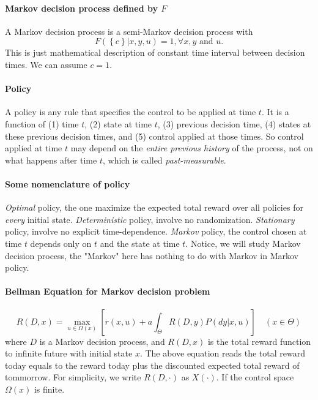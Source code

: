 \paragraph{Markov decision process defined by $F$}
A Markov decision process is a semi-Markov decision process with 
\[
	F\left( \left\{ c \right\} | x, y, u \right) = 1, \forall x, y \textrm{ and } u.
\]
This is just mathematical description of constant time interval between decision times. We can assume $c=1$.

\paragraph{Policy}
A policy is any rule that specifies the control to be applied at time $t$. It is a function of (1) time $t$, (2) state at time $t$, (3) previous decision time,
(4) states at these previous decision times, and (5) control applied at those times. So control applied at time $t$
may depend on the \textit{entire previous history} of the process, not on what happens after time $t$, which is called 
\textit{past-measurable}.

\paragraph{Some nomenclature of policy}
\textit{Optimal} policy, the one maximize the expected total reward over all policies for  \textit{every} initial state.
\textit{Deterministic} policy, involve no randomization.
\textit{Stationary} policy, involve no explicit time-dependence.
\textit{Markov} policy, the control chosen at time $t$ depends only on $t$ and the state at time $t$.
Notice, we will study Markov decision process, the "Markov" here has nothing to do with Markov in Markov policy.


\paragraph{Bellman Equation for Markov decision problem}
\begin{equation} \label{bellman}
	R(D,x) = \max_{u \in \Omega(x)} \left[ r(x,u) + a \int_{\Theta} R(D,y) P(dy | x,u) \right] \quad (x \in \Theta)
\end{equation}
where $D$ is a Markov decision process, and $R(D,x)$ is the total reward function to infinite future with initial state $x$.
The above equation reads the total reward today equals to the reward today plus the discounted expected total reward of tommorrow. For
simplicity, we write $R(D,\cdot)$ as $X(\cdot)$. If the control space $\Omega(x)$ is finite.

